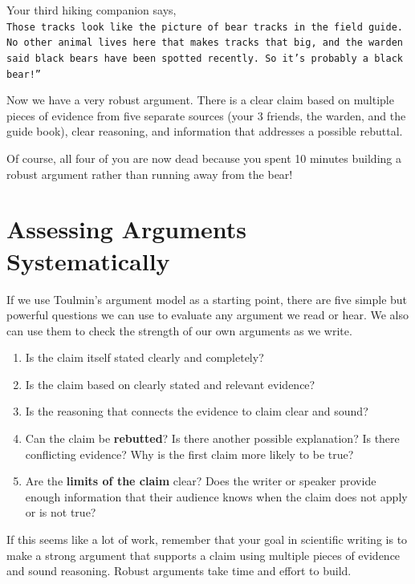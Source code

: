 \documentclass[
]{book}
\providecommand{\tightlist}{%
  \setlength{\itemsep}{0pt}\setlength{\parskip}{0pt}}
\begin{document}
Your third hiking companion says,
\texttt{Those\ tracks\ look\ like\ the\ picture\ of\ bear\ tracks\ in\ the\ field\ guide.\ No\ other\ animal\ lives\ here\ that\ makes\ tracks\ that\ big,\ and\ the\ warden\ said\ black\ bears\ have\ been\ spotted\ recently.\ So\ it’s\ probably\ a\ black\ bear!”}

Now we have a very robust argument. There is a clear claim based on multiple pieces of evidence from five separate sources (your 3 friends, the warden, and the guide book), clear reasoning, and information that addresses a possible rebuttal.

Of course, all four of you are now dead because you spent 10 minutes building a robust argument rather than running away from the bear!

\hypertarget{assessing-arguments-systematically}{%
\section{Assessing Arguments Systematically}\label{assessing-arguments-systematically}}

If we use Toulmin's argument model as a starting point, there are five simple but powerful questions we can use to evaluate any argument we read or hear. We also can use them to check the strength of our own arguments as we write.

\begin{enumerate}
\def\labelenumi{\arabic{enumi}.}
\tightlist
\item
  Is the claim itself stated clearly and completely?
\item
  Is the claim based on clearly stated and relevant evidence?
\item
  Is the reasoning that connects the evidence to claim clear and sound?
\item
  Can the claim be \textbf{rebutted}? Is there another possible explanation? Is there conflicting evidence? Why is the first claim more likely to be true?
\item
  Are the \textbf{limits of the claim} clear? Does the writer or speaker provide enough information that their audience knows when the claim does not apply or is not true?
\end{enumerate}

If this seems like a lot of work, remember that your goal in scientific writing is to make a strong argument that supports a claim using multiple pieces of evidence and sound reasoning. Robust arguments take time and effort to build.
\end{document}
